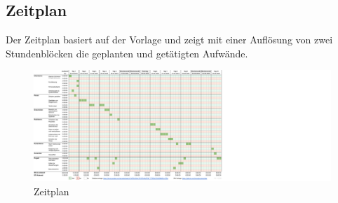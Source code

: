 \begin{landscape}
  \chapter{Zeitplan}
  Der Zeitplan basiert auf der Vorlage \cite{Buhler_ipa-timetable_2022} und zeigt mit einer Auflösung von zwei Stundenblöcken die geplanten und getätigten Aufwände.
  \begin{figure}[H]
    \begin{center}
      \includegraphics[height=0.75\textheight]{../res/timeplan.pdf}
    \end{center}
    \caption[\enquote{Zeitplan} erstellt mit Google Sheets]{Zeitplan}
    \label{fig:timeplan}
  \end{figure}
\end{landscape}
